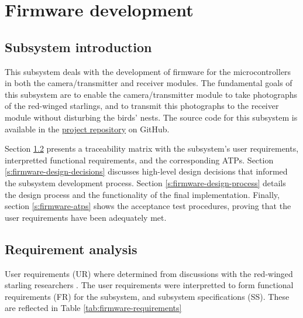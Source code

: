\chapter{Firmware development \label{ch:firmware}}
\section{Subsystem introduction}

This subsystem deals with the development of firmware for the microcontrollers in both the camera/transmitter and receiver modules. The fundamental goals of this subsystem are to enable the camera/transmitter module to take photographs of the red-winged starlings, and to transmit this photographs to the receiver module without disturbing the birds' nests. The source code for this subsystem is available in the \href{https://github.com/rothdu/EEE4113F-Group13-2024}{project repository} on GitHub.

Section \ref{s:firmware-requirements} presents a traceability matrix with the subsystem's user requirements, interpretted functional requirements, and the corresponding ATPs. Section \ref{s:firmware-design-decisions} discusses high-level design decisions that informed the subsystem development process. Section \ref{s:firmware-design-process} details the design process and the functionality of the final implementation. Finally, section \ref{s:firmware-atps} shows the acceptance test procedures, proving that the user requirements have been adequately met.

\section{Requirement analysis} \label{s:firmware-requirements}
User requirements (UR) where determined from discussions with the red-winged starling researchers \cite{hofmeyer2024private}. The user requirements were interpretted to form functional requirements (FR) for the subsystem, and subsystem specifications (SS). These are reflected in Table \ref{tab:firmware-requirements}

